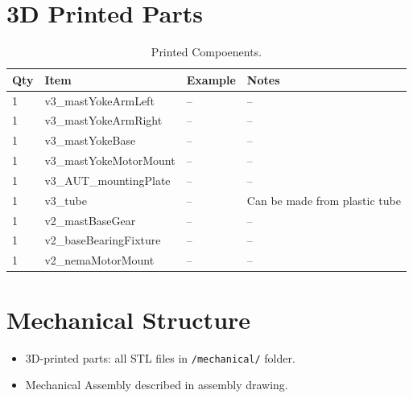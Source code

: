 \section{3D Printed Parts}

\begin{table}[H]
  \centering
  \begin{tabular}{@{}lll l@{}}
    \toprule
    Qty & Item & Example & Notes \\
    \midrule
    1 & v3\_mastYokeArmLeft & -- & --\\
    1 & v3\_mastYokeArmRight & -- & --\\
    1 & v3\_mastYokeBase & -- & --\\
    1 & v3\_mastYokeMotorMount & -- & --\\
    1 & v3\_AUT\_mountingPlate & -- & --\\
    1 & v3\_tube & -- & Can be made from plastic tube\\
    1 & v2\_mastBaseGear & -- & --\\
    1 & v2\_baseBearingFixture & -- & --\\
    1 & v2\_nemaMotorMount & -- & --\\
    \bottomrule
  \end{tabular}
  \caption{Printed Compoenents.}
\end{table}

\section{Mechanical Structure}

\begin{itemize}
  \item 3D-printed parts: all STL files in \texttt{/mechanical/} folder.
  \item Mechanical Assembly described in assembly drawing.
\end{itemize}
